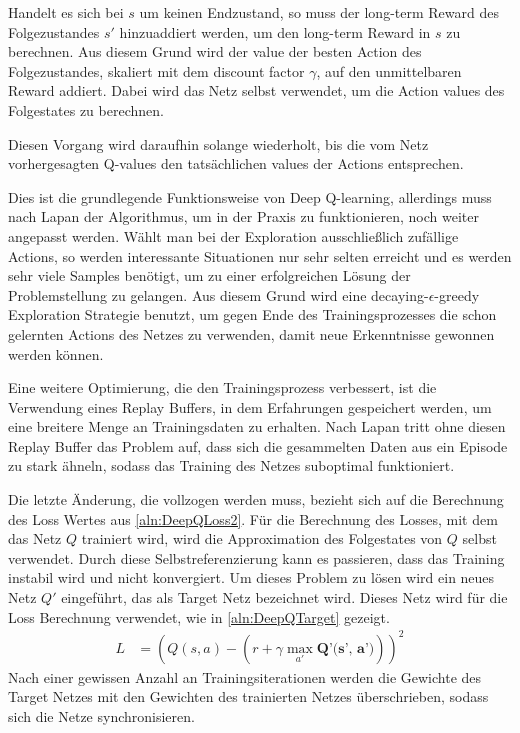 \documentclass[11pt]{scrartcl}
\begin{document}
Handelt es sich bei $s$ um keinen Endzustand, so muss der long-term Reward des
Folgezustandes $s'$ hinzuaddiert werden, um den long-term Reward in $s$ zu berechnen. Aus
diesem Grund wird der value der besten Action des Folgezustandes, skaliert mit dem 
discount factor $\gamma$, auf den unmittelbaren Reward addiert. Dabei wird das Netz selbst
verwendet, um die Action values des Folgestates zu berechnen.

Diesen Vorgang wird daraufhin solange wiederholt, bis die vom Netz vorhergesagten Q-values
den tat\-säch\-lich\-en values der Actions entsprechen.

Dies ist die grundlegende Funktionsweise von Deep Q-learning, allerdings muss nach Lapan
\cite[~S.202]{L2018} der Algorithmus, um in der Praxis zu funktionieren, noch weiter
angepasst werden. Wählt man bei der Exploration ausschließlich zufällige Actions, so
werden interessante Situationen nur sehr selten erreicht und es werden sehr viele Samples
benötigt, um zu einer erfolgreichen Lösung der Problemstellung zu gelangen. Aus diesem
Grund wird eine decaying-$\epsilon$-greedy Exploration Strategie benutzt, um gegen Ende
des Trainingsprozesses die schon gelernten Actions des Netzes zu verwenden, damit neue
Erkenntnisse gewonnen werden können.

Eine weitere Optimierung, die den Trainingsprozess verbessert, ist die Verwendung eines
Replay Buffers, in dem Erfahrungen gespeichert werden, um eine breitere Menge an
Trainingsdaten zu erhalten. Nach Lapan \cite[~S.204]{L2018} tritt ohne diesen Replay
Buffer das Problem auf, dass sich die gesammelten Daten aus ein Episode zu stark ähneln,
sodass das Training des Netzes suboptimal funktioniert.

Die letzte Änderung, die vollzogen werden muss, bezieht sich auf die Berechnung des Loss
Wertes aus \autoref{aln:DeepQLoss2}. Für die Berechnung des Losses, mit dem das Netz $Q$
trainiert wird, wird die Approximation des Folgestates von $Q$ selbst verwendet. Durch
diese Selbstreferenzierung kann es passieren, dass das Training instabil wird und nicht
konvergiert. Um dieses Problem zu lösen wird ein neues Netz $Q'$ eingeführt, das als
Target Netz bezeichnet wird. Dieses Netz wird für die Loss Berechnung verwendet, wie in
\autoref{aln:DeepQTarget} gezeigt.
\begin{align}
  L & = \left(Q(s, a) - \left(r + \gamma \max_{a'} \textbf{Q'(s', a')}\right)\right)^2
  \label{aln:DeepQTarget}
\end{align}
\noindent
Nach einer gewissen Anzahl an Trainingsiterationen werden die Gewichte des Target Netzes
mit den Gewichten des trainierten Netzes überschrieben, sodass sich die Netze
synchronisieren.
\end{document}
